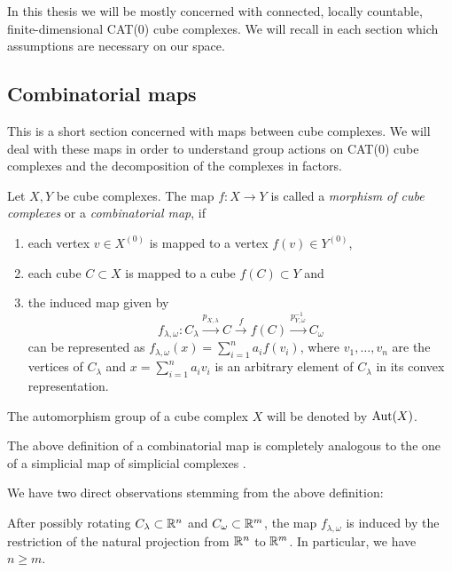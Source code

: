 \begin{rem}
  In this thesis we will be mostly concerned with connected, locally countable, finite-dimensional CAT(0) cube complexes. We will recall in each section which assumptions are necessary on our space.
\end{rem}

\subsection{Combinatorial maps}
\label{sec:comb-map}

This is a short section concerned with maps between cube complexes. We will deal with these maps in order to understand group actions on CAT(0) cube complexes and the decomposition of the complexes in factors.

\begin{defin}
  \label{def:morphism-ccc}
  Let \(X,Y\) be cube complexes. The map \(f\colon X \to Y\) is called a \emph{morphism of cube complexes} or a \emph{combinatorial map}, if
  \begin{enumerate}
  \item each vertex \(v \in X^{(0)}\) is mapped to a vertex \(f(v) \in Y^{(0)}\),
  \item each cube \(C \subset X\) is mapped to a cube \(f(C) \subset Y\) and
  \item the induced map given by
    \[
      f_{\lambda, \omega}\colon C_\lambda \xrightarrow{p_{X,\lambda}} C \xrightarrow{f} f(C) \xrightarrow{p^{-1}_{Y,\omega}} C_\omega
    \]
    can be represented as \(f_{\lambda,\omega}(x) = \sum_{i=1}^n a_i f(v_i)\), where \(v_1, \dots, v_n\) are the vertices of \(C_\lambda\) and \(x = \sum_{i=1}^n a_i v_i\) is an arbitrary element of \(C_\lambda\) in its convex representation.
  \end{enumerate}
  The automorphism group of a cube complex \(X\) will be denoted by \(\operatorname{Aut}(X)\).
\end{defin}

\begin{rem}
  The above definition of a combinatorial map is completely analogous to the one of a simplicial map of simplicial complexes \cite[c.\,f.][]{Singer}.
\end{rem}

We have two direct observations stemming from the above definition:

\begin{lemma}
  After possibly rotating \(C_\lambda \subset \mathbb{R}^n\) and \(C_\omega \subset \mathbb{R}^m\), the map \(f_{\lambda, \omega}\) is induced by the restriction of the natural projection from \(\mathbb{R}^n\) to \(\mathbb{R}^m\). In particular, we have \(n \geq m\).
\end{lemma}

